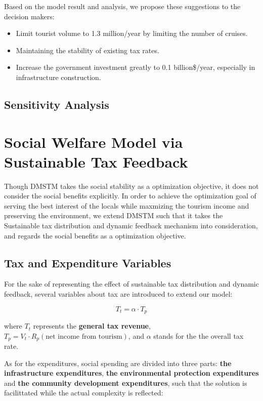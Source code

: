 \documentclass{mcmthesis}
\begin{document}
Based on the model result and analysis, we propose these suggestions to the decision makers:
\begin{itemize}
  \item Limit tourist volume to 1.3 million/year by limiting the number of cruises.
  \item Maintaining the stability of existing tax rates.
  \item Increase the government investment greatly to 0.1 billion\$/year, especially in infrastructure construction.
\end{itemize}

\subsection{Sensitivity Analysis}

\section{Social Welfare Model via Sustainable Tax Feedback}
Though DMSTM takes the social stability as a optimization objective, it does not consider the social benefits explicitly. 
In order to achieve the optimization goal of serving the best interest of the locals while maxmizing the tourism income 
and preserving the environment, we extend DMSTM such that it takes the Sustainable tax distribution and dynamic feedback mechanism\cite{bayer2004sterman}
into consideration, and regards the social benefits as a optimization objective.

\subsection{Tax and Expenditure Variables}
For the sake of representing the effect of sustainable tax distribution and dynamic feedback, 
several variables about tax are introduced to extend our model:

\begin{equation}
  T_t = \alpha \cdot T_p
\end{equation}

where $T_t$ represents the \textbf{general tax revenue}, $T_p = V_t \cdot R_p (\text{net income from tourism})$, 
and $\alpha$ stands for the the overall tax rate.

As for the expenditures, social spending are divided into three parts: \textbf{the infrastructure expenditures}, 
\textbf{the environmental protection expenditures} and \textbf{the community development expenditures}, 
such that the solution is facilittated while the actual complexity is reflected:
\end{document}
